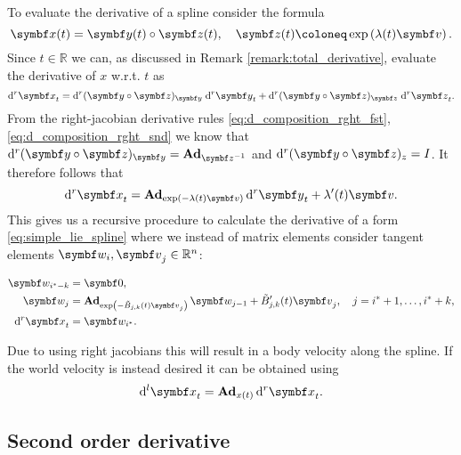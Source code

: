 To evaluate the derivative of a spline consider the formula
\begin{equation}
  \x(t) = \y(t) \circ \z(t), \quad \z(t) \coloneq \exp \left( \lambda(t) \bv \right).
\end{equation}
Since $t \in \mathbb{R}$ we can, as discussed in Remark \ref{remark:total_derivative}, evaluate the derivative of $x$ w.r.t. $t$ as
\begin{equation}
  \mathrm{d}^r \x_t = \mathrm{d}^r (\y \circ \z)_\y \; \mathrm{d}^r \y_t + \mathrm{d}^r (\y \circ \z)_\z \; \mathrm{d}^r \z_t.
\end{equation}
From the right-jacobian derivative rules \eqref{eq:d_composition_rght_fst}, \eqref{eq:d_composition_rght_snd} we know that $\mathrm{d}^r (\y \circ \z)_\y = \bAd_{\z^{-1}}$ and $\mathrm{d}^r (\y \circ \z)_z = I$. It therefore follows that
\begin{equation}
  \mathrm{d}^r \x_t = \bAd_{\exp(-\lambda(t) \bv)} \mathrm{d}^r \y_t + \lambda'(t) \bv.
\end{equation}
This gives us a recursive procedure to calculate the derivative of a form \eqref{eq:simple_lie_spline} where we instead of matrix elements consider tangent elements $\symbf w_i, \bv_j \in \mathbb{R}^n$:
\begin{important}
  \begin{equation}
    \label{eq:bspline_dx_dt}
    \begin{aligned}
      \symbf w_{i^* - k} & = \symbf 0,                                                                                                                         \\
      \symbf w_{j}       & = \bAd_{\exp \left( - \tilde B_{j, k}(t) \bv_j \right)} \symbf w_{j-1} + \tilde B_{j, k}'(t) \bv_j, \quad j = i^*+1, \ldots, i^*+k, \\
      \mathrm{d}^r \x_t  & = \symbf w_{i^*}.
    \end{aligned}
  \end{equation}
\end{important}
Due to using right jacobians this will result in a body velocity along the spline. If the world velocity is instead desired it can be obtained using
\begin{equation}
  \mathrm{d}^l \x_t = \bAd_{x(t)} \mathrm{d}^r \x_t.
\end{equation}

\subsection{Second order derivative}

